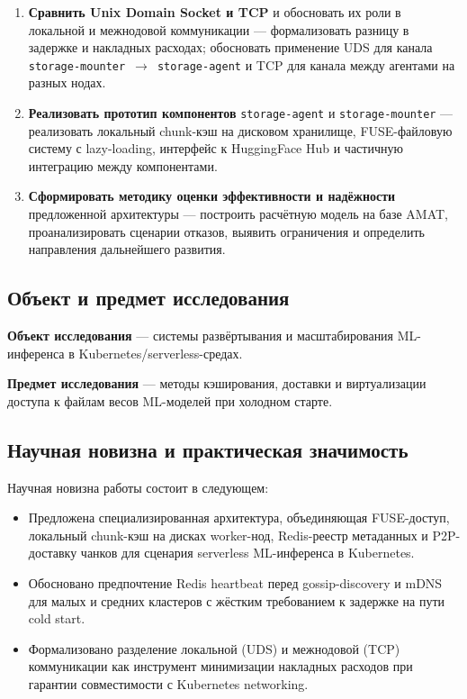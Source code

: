 \begin{enumerate}[leftmargin=*]
  \item \textbf{Сравнить Unix Domain Socket и TCP} и обосновать их роли в локальной и межнодовой коммуникации --- формализовать разницу в задержке и накладных расходах; обосновать применение UDS для канала \texttt{storage-mounter}~$\to$~\texttt{storage-agent} и TCP для канала между агентами на разных нодах.

  \item \textbf{Реализовать прототип компонентов} \texttt{storage-agent} и \texttt{storage-mounter} --- реализовать локальный chunk-кэш на дисковом хранилище, FUSE-файловую систему с lazy-loading, интерфейс к HuggingFace Hub и частичную интеграцию между компонентами.

  \item \textbf{Сформировать методику оценки эффективности и надёжности} предложенной архитектуры --- построить расчётную модель на базе AMAT, проанализировать сценарии отказов, выявить ограничения и определить направления дальнейшего развития.
\end{enumerate}

\subsection*{Объект и предмет исследования}

\textbf{Объект исследования} --- системы развёртывания и масштабирования ML-инференса в Kubernetes/serverless-средах.

\textbf{Предмет исследования} --- методы кэширования, доставки и виртуализации доступа к файлам весов ML-моделей при холодном старте.

\subsection*{Научная новизна и практическая значимость}

Научная новизна работы состоит в следующем:

\begin{itemize}[leftmargin=*]
  \item Предложена специализированная архитектура, объединяющая FUSE-доступ, локальный chunk-кэш на дисках worker-нод, Redis-реестр метаданных и P2P-доставку чанков для сценария serverless ML-инференса в Kubernetes.
  \item Обосновано предпочтение Redis heartbeat перед gossip-discovery и mDNS для малых и средних кластеров с жёстким требованием к задержке на пути cold start.
  \item Формализовано разделение локальной (UDS) и межнодовой (TCP) коммуникации как инструмент минимизации накладных расходов при гарантии совместимости с Kubernetes networking.
\end{itemize}

